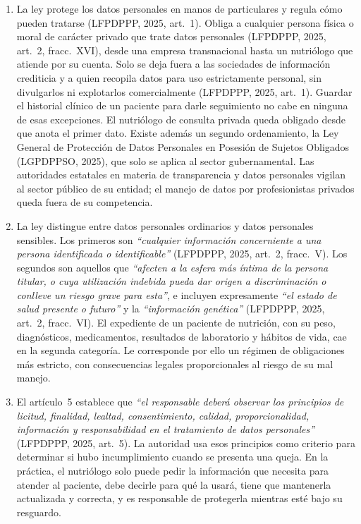 \documentclass[12pt, a4paper]{article}
\begin{document}
\begin{enumerate}[label=\Roman*.]
  \item La ley protege los datos personales en manos de
  particulares y regula cómo pueden tratarse (LFPDPPP, 2025,
  art.~1). Obliga a cualquier persona física o moral de carácter
  privado que trate datos personales (LFPDPPP, 2025, art.~2,
  fracc.~XVI), desde una empresa transnacional hasta un nutriólogo
  que atiende por su cuenta. Solo se deja fuera a las sociedades de
  información crediticia y a quien recopila datos para uso
  estrictamente personal, sin divulgarlos ni explotarlos
  comercialmente (LFPDPPP, 2025, art.~1). Guardar el historial
  clínico de un paciente para darle seguimiento no cabe en ninguna
  de esas excepciones. El nutriólogo de consulta privada queda
  obligado desde que anota el primer dato. Existe además un segundo
  ordenamiento, la Ley General de Protección de Datos Personales en
  Posesión de Sujetos Obligados (LGPDPPSO, 2025), que solo se aplica
  al sector gubernamental. Las autoridades estatales en materia de
  transparencia y datos personales vigilan al sector público de su
  entidad; el manejo de datos por profesionistas privados queda
  fuera de su competencia.
 
  \item La ley distingue entre datos personales ordinarios y datos
  personales sensibles. Los primeros son \textit{``cualquier
  información concerniente a una persona identificada o
  identificable''} (LFPDPPP, 2025, art.~2, fracc.~V). Los
  segundos son aquellos que \textit{``afecten a la esfera más
  íntima de la persona titular, o cuya utilización indebida
  pueda dar origen a discriminación o conlleve un riesgo grave
  para esta''}, e incluyen expresamente \textit{``el estado
  de salud presente o futuro''} y la \textit{``información
  genética''} (LFPDPPP, 2025, art.~2, fracc.~VI). El expediente
  de un paciente de nutrición, con su peso, diagnósticos,
  medicamentos, resultados de laboratorio y hábitos de vida, cae en
  la segunda categoría. Le corresponde por ello un régimen de
  obligaciones más estricto, con consecuencias legales
  proporcionales al riesgo de su mal manejo.
 
  \item El artículo~5 establece que \textit{``el responsable deberá
  observar los principios de licitud, finalidad, lealtad,
  consentimiento, calidad, proporcionalidad, información y
  responsabilidad en el tratamiento de datos personales''}
  (LFPDPPP, 2025, art.~5). La autoridad usa esos principios como
  criterio para determinar si hubo incumplimiento cuando se presenta
  una queja. En la práctica, el nutriólogo solo puede pedir la
  información que necesita para atender al paciente, debe decirle
  para qué la usará, tiene que mantenerla actualizada y correcta, y
  es responsable de protegerla mientras esté bajo su resguardo.
 

\end{enumerate}
\end{document}

